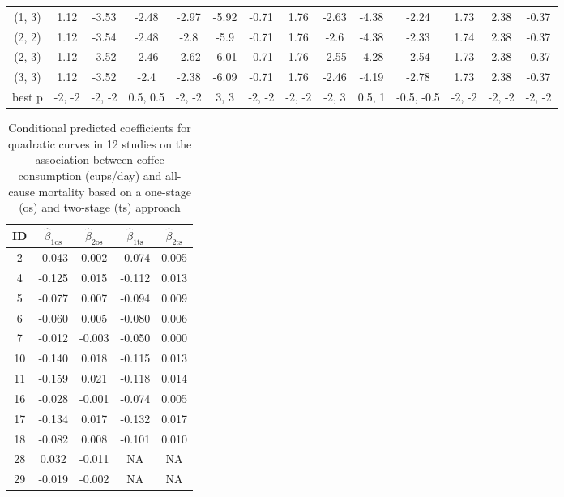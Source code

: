 \documentclass[11pt,a4paper,twoside,openany]{book}\usepackage{knitr}
\begin{document}
{\begin{knitrout}
\begin{table}
\begin{tabular}[t]{cccccccccccccc}
(1, 3) & 1.12 & -3.53 & -2.48 & -2.97 & -5.92 & -0.71 & 1.76 & -2.63 & -4.38 & -2.24 & 1.73 & 2.38 & -0.37\\
(2, 2) & 1.12 & -3.54 & -2.48 & -2.8 & -5.9 & -0.71 & 1.76 & -2.6 & -4.38 & -2.33 & 1.74 & 2.38 & -0.37\\
(2, 3) & 1.12 & -3.52 & -2.46 & -2.62 & -6.01 & -0.71 & 1.76 & -2.55 & -4.28 & -2.54 & 1.73 & 2.38 & -0.37\\
\addlinespace
(3, 3) & 1.12 & -3.52 & -2.4 & -2.38 & -6.09 & -0.71 & 1.76 & -2.46 & -4.19 & -2.78 & 1.73 & 2.38 & -0.37\\
best p & -2, -2 & -2, -2 & 0.5, 0.5 & -2, -2 & 3, 3 & -2, -2 & -2, -2 & -2, 3 & 0.5, 1 & -0.5, -0.5 & -2, -2 & -2, -2 & -2, -2\\
\bottomrule
\end{tabular}
\end{table}


\end{knitrout}

\begin{table}[!h]

\caption{\label{tab:blup_tab}Conditional predicted coefficients for quadratic curves in 12 studies on the association between coffee consumption (cups/day) and all-cause mortality based on a one-stage (os) and two-stage (ts) approach}
\centering
\begin{tabular}[t]{ccccc}
\toprule
ID & $\hat \beta_{1\textrm{os}}$ & $\hat \beta_{2\textrm{os}}$ & $\hat \beta_{1\textrm{ts}}$ & $\hat \beta_{2\textrm{ts}}$\\
\midrule
2 & -0.043 & 0.002 & -0.074 & 0.005\\
4 & -0.125 & 0.015 & -0.112 & 0.013\\
5 & -0.077 & 0.007 & -0.094 & 0.009\\
6 & -0.060 & 0.005 & -0.080 & 0.006\\
7 & -0.012 & -0.003 & -0.050 & 0.000\\
10 & -0.140 & 0.018 & -0.115 & 0.013\\
11 & -0.159 & 0.021 & -0.118 & 0.014\\
16 & -0.028 & -0.001 & -0.074 & 0.005\\
17 & -0.134 & 0.017 & -0.132 & 0.017\\
18 & -0.082 & 0.008 & -0.101 & 0.010\\
28 & 0.032 & -0.011 & NA & NA\\
29 & -0.019 & -0.002 & NA & NA\\
\bottomrule
\end{tabular}
\end{table}





}
\end{document}
